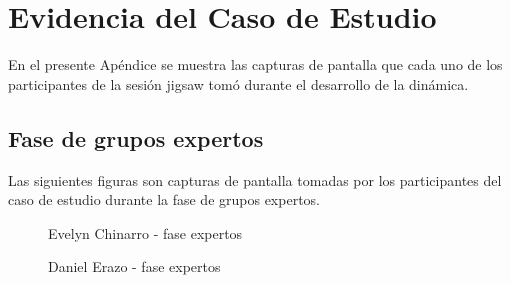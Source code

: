 \chapter{Evidencia del Caso de Estudio}\label{apendice.D}
En el presente Apéndice se muestra las capturas de pantalla que cada uno de los participantes de la sesión jigsaw tomó durante el desarrollo de la dinámica.

\section{Fase de grupos expertos}
Las siguientes figuras son capturas de pantalla tomadas por los participantes del caso de estudio durante la fase de grupos expertos.
\begin{figure}[h]
	\centering
	\caption{Evelyn Chinarro - fase expertos}
	\label{fig:evy_fase_expertos}
\end{figure}
\begin{figure}[h]
	\centering
	\caption{Daniel Erazo - fase expertos}
	\label{fig:daniel_fase_expertos}
\end{figure}
